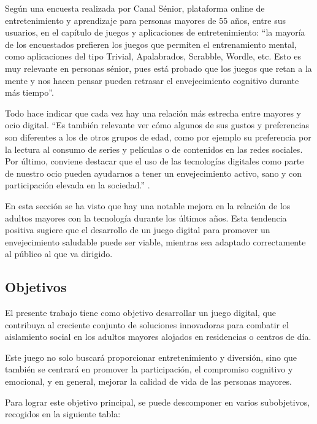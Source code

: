 Según una encuesta realizada por Canal Sénior, plataforma online de entretenimiento y aprendizaje para personas mayores de 55 años, entre sus usuarios, en el capítulo de juegos y aplicaciones de entretenimiento: \enquote{la mayoría de los encuestados prefieren los juegos que permiten el entrenamiento mental, como aplicaciones del tipo Trivial, Apalabrados, Scrabble, Wordle, etc. Esto es muy relevante en personas sénior, pues está probado que los juegos que retan a la mente y nos hacen pensar pueden retrasar el envejecimiento cognitivo durante más tiempo}.

\newpage
Todo hace indicar que cada vez hay una relación más estrecha entre mayores y ocio digital. \enquote{Es también relevante ver cómo algunos de sus gustos y preferencias son diferentes a los de otros grupos de edad, como por ejemplo su preferencia por la lectura al consumo de series y películas o de contenidos en las redes sociales. Por último, conviene destacar que el uso de las tecnologías digitales como parte de nuestro ocio pueden ayudarnos a tener un envejecimiento activo, sano y con participación elevada en la sociedad.} \parencite{intro6}.

En esta sección se ha visto que hay una notable mejora en la relación de los adultos mayores con la tecnología durante los últimos años. Esta tendencia positiva sugiere que el desarrollo de un juego digital para promover un envejecimiento saludable puede ser viable, mientras sea adaptado correctamente al público al que va dirigido.

\newpage
\subsection{Objetivos}
El presente trabajo tiene como objetivo desarrollar un juego digital, que contribuya al creciente conjunto de soluciones innovadoras para combatir el aislamiento social en los adultos mayores alojados en residencias o centros de día.

Este juego no solo buscará proporcionar entretenimiento y diversión, sino que también se centrará en promover la participación, el compromiso cognitivo y emocional, y en general, mejorar la calidad de vida de las personas mayores. 

Para lograr este objetivo principal, se puede descomponer en varios subobjetivos, recogidos en la siguiente tabla:

